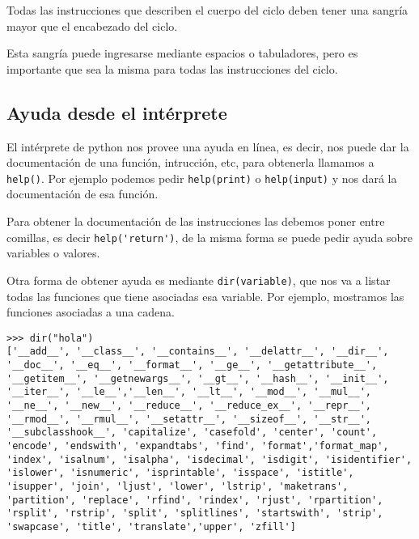 \begin{atencion}
Todas las instrucciones que describen el cuerpo del ciclo deben tener una
sangría mayor que el encabezado del ciclo.

Esta sangría puede ingresarse mediante espacios o tabuladores, pero es
importante que sea la misma para todas las instrucciones del ciclo.
\end{atencion}

\subsection{Ayuda desde el intérprete}

El intérprete de python nos provee una ayuda en línea, es decir, nos puede dar
la documentación de una función, intrucción, etc, para
obtenerla llamamos a \lstinline!help()!. Por ejemplo podemos pedir
\lstinline!help(print)! o \lstinline!help(input)! y nos dará la documentación
de esa función.

Para obtener la documentación de las instrucciones las debemos poner entre
comillas, es decir \lstinline!help('return')!, de la misma forma se puede
pedir ayuda sobre variables o valores.

Otra forma de obtener ayuda es mediante \lstinline!dir(variable)!, que nos va a
listar todas las funciones que tiene asociadas esa variable. Por ejemplo,
mostramos las funciones asociadas a una cadena.

\begin{lstlisting}[numbers=none]
>>> dir("hola")
['__add__', '__class__', '__contains__', '__delattr__', '__dir__',
'__doc__', '__eq__', '__format__', '__ge__', '__getattribute__',
'__getitem__', '__getnewargs__', '__gt__', '__hash__', '__init__',
'__iter__', '__le__','__len__', '__lt__', '__mod__', '__mul__',
'__ne__', '__new__', '__reduce__', '__reduce_ex__', '__repr__',
'__rmod__', '__rmul__', '__setattr__', '__sizeof__', '__str__',
'__subclasshook__', 'capitalize', 'casefold', 'center', 'count',
'encode', 'endswith', 'expandtabs', 'find', 'format','format_map',
'index', 'isalnum', 'isalpha', 'isdecimal', 'isdigit', 'isidentifier',
'islower', 'isnumeric', 'isprintable', 'isspace', 'istitle',
'isupper', 'join', 'ljust', 'lower', 'lstrip', 'maketrans',
'partition', 'replace', 'rfind', 'rindex', 'rjust', 'rpartition',
'rsplit', 'rstrip', 'split', 'splitlines', 'startswith', 'strip',
'swapcase', 'title', 'translate','upper', 'zfill']
\end{lstlisting}

